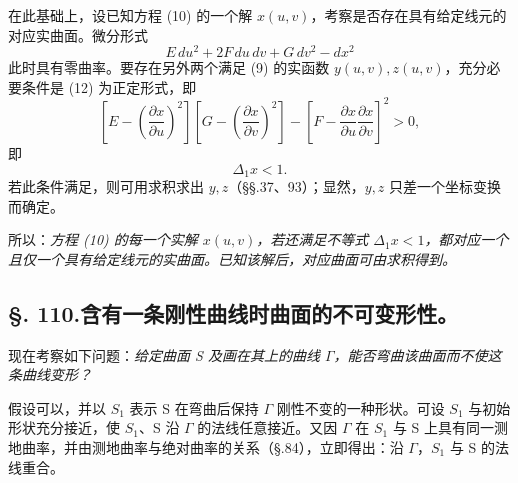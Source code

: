在此基础上，设已知方程 (10) 的一个解 \(x(u,v)\)，考察是否存在具有给定线元的对应实曲面。微分形式
\begin{equation}\tag{12}
 E\,du^2+2F\,du\,dv+G\,dv^2-dx^2
\end{equation}
此时具有零曲率。要存在另外两个满足 (9) 的实函数 \(y(u,v),z(u,v)\)，充分必要条件是 (12) 为正定形式，即
\[
\left[E-\left(\frac{\partial x}{\partial u}\right)^2\right]
\left[G-\left(\frac{\partial x}{\partial v}\right)^2\right]
-\left[F-\frac{\partial x}{\partial u}\frac{\partial x}{\partial v}\right]^2>0,
\]
即
\[
 \Delta_1x<1.
\]
若此条件满足，则可用求积求出 \(y,z\)（\S\S.37、93）；显然，\(y,z\) 只差一个坐标变换而确定。

所以：\emph{方程 (10) 的每一个实解 \(x(u,v)\)，若还满足不等式 \(\Delta_1x<1\)，都对应一个且仅一个具有给定线元的实曲面。已知该解后，对应曲面可由求积得到。}

\subsection*{\S. 110.\quad 含有一条刚性曲线时曲面的不可变形性。}

现在考察如下问题：\emph{给定曲面 S 及画在其上的曲线 \(\Gamma\)，能否弯曲该曲面而不使这条曲线变形？}

假设可以，并以 \(S_1\) 表示 S 在弯曲后保持 \(\Gamma\) 刚性不变的一种形状。可设 \(S_1\) 与初始形状充分接近，使 \(S_1\)、S 沿 \(\Gamma\) 的法线任意接近。又因 \(\Gamma\) 在 \(S_1\) 与 S 上具有同一测地曲率，并由测地曲率与绝对曲率的关系（\S.84），立即得出：沿 \(\Gamma\)，\(S_1\) 与 S 的法线重合。

